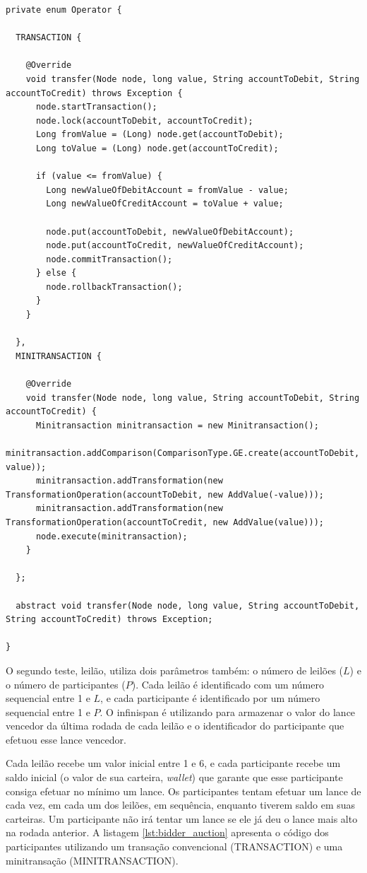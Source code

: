 \documentclass[11pt,twoside,a4paper]{book}
\begin{document}
\begin{lstlisting}[caption={Operadores que executam as transferências}, label=lst:operator_account]
private enum Operator {

  TRANSACTION {

    @Override
    void transfer(Node node, long value, String accountToDebit, String accountToCredit) throws Exception {
      node.startTransaction();
      node.lock(accountToDebit, accountToCredit);
      Long fromValue = (Long) node.get(accountToDebit);
      Long toValue = (Long) node.get(accountToCredit);

      if (value <= fromValue) {
        Long newValueOfDebitAccount = fromValue - value;
        Long newValueOfCreditAccount = toValue + value;

        node.put(accountToDebit, newValueOfDebitAccount);
        node.put(accountToCredit, newValueOfCreditAccount);
        node.commitTransaction();
      } else {
        node.rollbackTransaction();
      }
    }

  },
  MINITRANSACTION {

    @Override
    void transfer(Node node, long value, String accountToDebit, String accountToCredit) {
      Minitransaction minitransaction = new Minitransaction();
      minitransaction.addComparison(ComparisonType.GE.create(accountToDebit, value));
      minitransaction.addTransformation(new TransformationOperation(accountToDebit, new AddValue(-value)));
      minitransaction.addTransformation(new TransformationOperation(accountToCredit, new AddValue(value)));
      node.execute(minitransaction);
    }

  };

  abstract void transfer(Node node, long value, String accountToDebit, String accountToCredit) throws Exception;

}
\end{lstlisting}

O segundo teste, leilão, utiliza dois parâmetros também: o número de leilões ($L$) e o número de participantes ($P$). Cada leilão é identificado com um número sequencial entre 1 e $L$, e cada participante é identificado por um número sequencial entre 1 e $P$. O infinispan é utilizando para armazenar o valor do lance vencedor da última rodada de cada leilão e o identificador do participante que efetuou esse lance vencedor.

Cada leilão recebe um valor inicial entre 1 e 6, e cada participante recebe um saldo inicial (o valor de sua carteira, \emph{wallet}) que garante que esse participante consiga efetuar no mínimo um lance. Os participantes tentam efetuar um lance de cada vez, em cada um dos leilões, em sequência, enquanto tiverem saldo em suas carteiras. Um participante não irá tentar um lance se ele já deu o lance mais alto na rodada anterior. A listagem \ref{lst:bidder_auction} apresenta o código dos participantes utilizando um transação convencional (TRANSACTION) e uma minitransação (MINITRANSACTION).  
\end{document}
